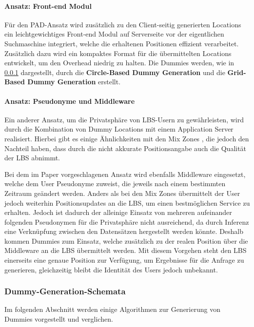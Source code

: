 \paragraph{Ansatz: Front-end Modul \cite{Lu2008}} \label{para:modul}
Für den PAD-Ansatz wird zusätzlich zu den Client-seitig generierten Locations ein leichtgewichtiges Front-end Modul auf Serverseite vor der eigentlichen Suchmaschine integriert, welche die erhaltenen Positionen effizient verarbeitet. Zusätzlich dazu wird ein kompaktes Format für die übermittelten Locations entwickelt, um den Overhead niedrig zu halten. Die Dummies werden, wie in \ref{subsubsection:dgschema} dargestellt, durch die \textbf{Circle-Based Dummy Generation} und die \textbf{Grid-Based Dummy Generation} erstellt.

\paragraph{Ansatz: Pseudonyme und Middleware \cite{Sahu2012}} \label{para:middle}
Ein anderer Ansatz, um die Privatsphäre von LBS-Usern zu gewährleisten, wird durch die Kombination von Dummy Locations mit einem Application Server realisiert. Hierbei gibt es einige Ähnlichkeiten mit den Mix Zones \cite{Beresford2003}, die jedoch den Nachteil haben, dass durch die nicht akkurate Positionsangabe auch die Qualität der LBS abnimmt. 

Bei dem im Paper vorgeschlagenen Ansatz wird ebenfalls Middleware eingesetzt, welche dem User Pseudonyme zuweist, die jeweils nach einem bestimmten Zeitraum geändert werden. Anders als bei den Mix Zones übermittelt der User jedoch weiterhin Positionsupdates an die LBS, um einen bestmöglichen Service zu erhalten. Jedoch ist dadurch der alleinige Einsatz von mehreren aufeinander folgenden Pseudonymen für die Privatsphäre nicht ausreichend, da durch Inferenz eine Verknüpfung zwischen den Datensätzen hergestellt werden könnte. Deshalb kommen Dummies zum Einsatz, welche zusätzlich zu der realen Position über die Middleware an die LBS übermittelt werden. Mit diesem Vorgehen steht den LBS einerseits eine genaue Position zur Verfügung, um Ergebnisse für die Anfrage zu generieren, gleichzeitig bleibt die Identität des Users jedoch unbekannt.

\subsubsection{Dummy-Generation-Schemata \cite{You2007, Lei2012, Kido2005}} \label{subsubsection:dgschema}
Im folgenden Abschnitt werden einige Algorithmen zur Generierung von Dummies vorgestellt und verglichen.

